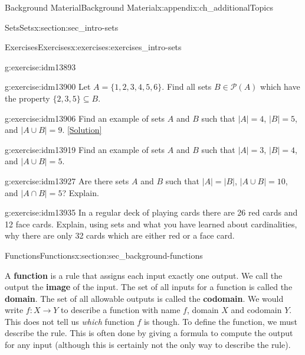 \documentclass[oneside,10pt,]{book}
\newcommand{\terminology}[1]{\textbf{#1}}
\numberwithin{equation}{chapter}
\def\pow{\mathcal P}
\begin{document}
\begin{appendixptx}{Background Material}{}{Background Material}{}{}{x:appendix:ch_additionalTopics}
\begin{sectionptx}{Sets}{}{Sets}{}{}{x:section:sec_intro-sets}
\begin{exercises-subsection}{Exercises}{}{Exercises}{}{}{x:exercises:exercises_intro-sets}
\begin{divisionexercise}{11}{}{}{g:exercise:idm13893}
\end{divisionexercise}%
\begin{divisionexercise}{12}{}{}{g:exercise:idm13900}%
Let \(A = \{1,2,3,4,5,6\}\). Find all sets \(B \in \pow(A)\) which have the property \(\{2,3,5\} \subseteq B\).%
\end{divisionexercise}%
\begin{divisionexercise}{13}{}{}{g:exercise:idm13906}%
Find an example of sets \(A\) and \(B\) such that \(|A| = 4\), \(|B| = 5\), and \(|A \cup B| = 9\).%
\space\hspace*{0pt}\hfill{\tiny\hyperlink{g:solution:idm13914-main}{[Solution]}}\end{divisionexercise}%
\begin{divisionexercise}{14}{}{}{g:exercise:idm13919}%
Find an example of sets \(A\) and \(B\) such that \(|A| = 3\), \(|B| = 4\), and \(|A \cup B| = 5\).%
\end{divisionexercise}%
\begin{divisionexercise}{15}{}{}{g:exercise:idm13927}%
Are there sets \(A\) and \(B\) such that \(|A| = |B|\), \(|A\cup B| = 10\), and \(|A\cap B| = 5\)? Explain.%
\end{divisionexercise}%
\begin{divisionexercise}{16}{}{}{g:exercise:idm13935}%
In a regular deck of playing cards there are 26 red cards and 12 face cards. Explain, using sets and what you have learned about cardinalities, why there are only 32 cards which are either red or a face card.%
\end{divisionexercise}%
\end{exercises-subsection}
\end{sectionptx}
%
%
\typeout{************************************************}
\typeout{************************************************}
%
\begin{sectionptx}{Functions}{}{Functions}{}{}{x:section:sec_background-functions}
\(\textit{}\)\begin{introduction}{}%
A \terminology{function} is a rule that assigns each input exactly one output.  We call the output the \terminology{image} of the input.  The set of all inputs for a function is called the \terminology{domain}. The set of all allowable outputs is called the \terminology{codomain}. We would write \(f:X \to Y\) to describe a function with name \(f\), domain \(X\) and codomain \(Y\). This does not tell us \emph{which} function \(f\) is though. To define the function, we must describe the rule. This is often done by giving a formula to compute the output for any input (although this is certainly not the only way to describe the rule).%

\end{introduction}
\end{sectionptx}
\end{appendixptx}
\end{document}
